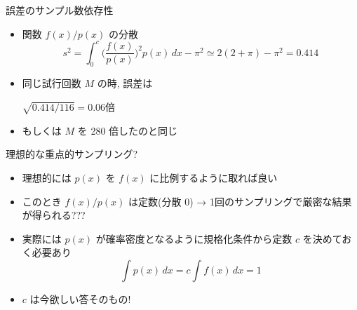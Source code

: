 \documentclass[dvipdfmx]{beamer}
\begin{document}
\begin{frame}[t,fragile]{誤差のサンプル数依存性}
  \begin{itemize}
    \setlength{\itemsep}{1em}
  \item 関数 $f(x)/p(x)$ の分散
    \[
    s^2 = \int_0^c \Big(\frac{f(x)}{p(x)}\Big)^2 p(x) \, dx - \pi^2 \simeq 2(2+\pi) - \pi^2 = 0.414
    \]
  \item 同じ試行回数 $M$ の時, 誤差は

    $\sqrt{0.414/116} = 0.06 \mbox{倍}$

  \item もしくは $M$ を 280 倍したのと同じ
  \vspace*{-5em}
  \hspace*{15em}
  \end{itemize}
\end{frame}

\begin{frame}[t,fragile]{理想的な重点的サンプリング?}
  \begin{itemize}
    \setlength{\itemsep}{1em}
  \item 理想的には $p(x)$ を $f(x)$ に比例するように取れば良い
  \item このとき $f(x) / p(x)$ は定数(分散 0) → 1回のサンプリングで厳密な結果が得られる???
  \item 実際には $p(x)$ が確率密度となるように規格化条件から定数 $c$ を決めておく必要あり
    \[
    \int p(x) \, dx = c \int f(x) \, dx = 1
    \]
  \item $c$ は今欲しい答そのもの!
  \end{itemize}
\end{frame}
\end{document}
